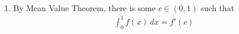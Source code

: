 \documentclass[a4paper,12pt]{article}
\theoremstyle{definition}
\begin{document}
\begin{enumerate}
\item 

By Mean Value Theorem, there is some $c \in (0,1)$ such that
\begin{align*}
\int_{0}^{1}f(x)\,dx = f'(c)
\end{align*}	 		
\end{enumerate}
\end{document}
